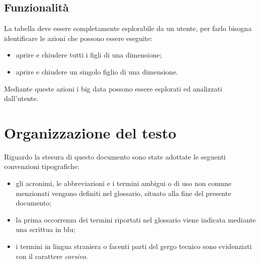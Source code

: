 \subsection{Funzionalità}
La tabella deve essere completamente esplorabile da un utente, per farlo bisogna identificare le azioni che possono essere eseguite:
\begin{itemize}
	\item aprire e chiudere tutti i figli di una dimensione;
	\item aprire e chiudere un singolo figlio di una dimensione.
\end{itemize}
Mediante queste azioni i big data possono essere esplorati ed analizzati dall'utente.

\section{Organizzazione del testo}
Riguardo la stesura di questo documento sono state adottate le seguenti convenzioni tipografiche:
\begin{itemize}
	\item gli acronimi, le abbreviazioni e i termini ambigui o di uso non comune menzionati vengono definiti nel glossario, situato alla fine del presente documento;
	\item la prima occorrenza dei termini riportati nel glossario viene indicata mediante una scrittua in blu;
	\item i termini in lingua straniera o facenti parti del gergo tecnico sono evidenziati con il carattere \emph{corsivo}.
\end{itemize}